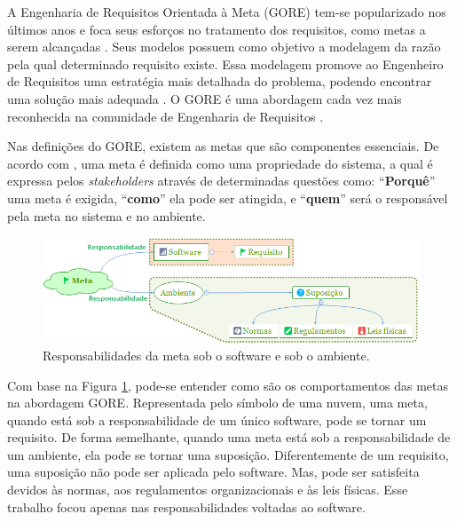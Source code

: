 A Engenharia de Requisitos Orientada à Meta (GORE) tem-se popularizado nos últimos anos e foca seus esforços no tratamento dos requisitos, como metas a serem alcançadas \cite{van2001goal}. Seus modelos possuem como objetivo a modelagem da razão pela qual determinado requisito existe. Essa modelagem promove ao Engenheiro de Requisitos uma estratégia mais detalhada do problema, podendo encontrar uma solução mais adequada \cite{van2001goal}\cite{chung2012non}. O GORE é uma abordagem cada vez mais reconhecida na comunidade de Engenharia de Requisitos \cite{van2001goal}.

Nas definições do GORE, existem as metas que são componentes essenciais. De acordo com \cite{van2001goal}, uma meta é definida como uma propriedade do sistema, a qual é expressa pelos \textit{stakeholders} através de determinadas questões como: “\textbf{Porquê}” uma meta é exigida, “\textbf{como}” ela pode ser atingida, e “\textbf{quem}” será o responsável pela meta no sistema e no ambiente.

\begin{figure}[h!]
	\centering
	\includegraphics[keepaspectratio=true,scale=0.8]{figuras/GORE.png}
	\caption{Responsabilidades da meta sob o software e sob o ambiente.}
	\label{Gore}
\end{figure}


\pagebreak

 Com base na Figura \ref{Gore}, pode-se entender como são os comportamentos das metas na abordagem GORE. Representada pelo símbolo de uma nuvem, uma meta, quando está sob a responsabilidade de um único software, pode se tornar um requisito. De forma semelhante, quando uma meta está sob a responsabilidade de um ambiente, ela pode se tornar uma suposição. Diferentemente de um requisito, uma suposição não pode ser aplicada pelo software. Mas, pode ser satisfeita devidos às normas, aos regulamentos organizacionais e às leis físicas\cite{van2001goal}. Esse trabalho focou apenas nas responsabilidades voltadas ao software.


